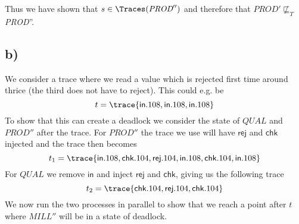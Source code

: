 \documentclass[a4paper, 11pt]{article}
\def\Prod{\textit{PROD}}
\def\Qual{\textit{QUAL}}
\def\Mill{\textit{MILL}}
\def\inc{\textsf{in}}
\def\chk{\textsf{chk}}
\def\rej{\textsf{rej}}
\begin{document}
Thus we have shown that $s \in \Traces(\Prod'')$ and therefore that $\Prod' \nsqsubseteq_T$ \Prod''.

\subsection{b)} %

We consider a trace where we read a value which is rejected first time around thrice (the third does not have to reject). This could e.g. be
\[
    t = \trace{\inc . 108, \inc . 108, \inc . 108}    
\]
To show that this can create a deadlock we consider the state of $\Qual$ and $\Prod''$ after the trace. For $\Prod''$ the trace we use will have $\rej$ and $\chk$ injected and the trace then becomes
\[
    t_1 = \trace{\inc . 108, \chk . 104, \rej . 104, \inc . 108, \chk . 104, \inc . 108}
\]
For $\Qual$ we remove $\inc$ and inject $\rej$ and $\chk$, giving us the following trace
\[
    t_2 = \trace{\chk . 104, \rej . 104, \chk . 104}
\]
We now run the two processes in parallel to show that we reach a point after $t$ where $\Mill''$ will be in a state of deadlock.
\end{document}
